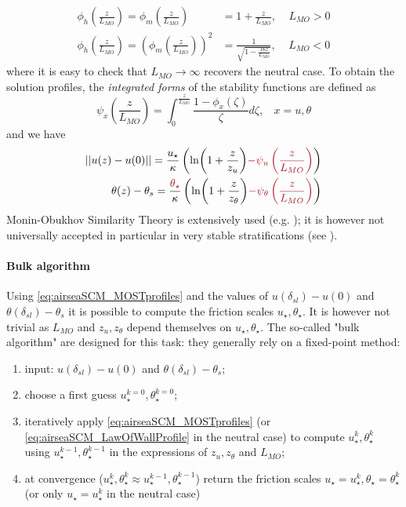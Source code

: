 \begin{equation}
\begin{aligned}
	\phi_h(\frac{z}{L_{MO}}) = \phi_m(\frac{z}{L_{MO}})
	&= 1+ \frac{z}{L_{MO}},
	~~~~~ L_{MO} > 0\\
	\phi_h(\frac{z}{L_{MO}}) =
	\left(\phi_m(\frac{z}{L_{MO}})\right)^2
	&= \frac{1}{\sqrt{1 - \frac{16 z}{L_{MO}}}},
	~~~~~L_{MO} < 0
\end{aligned}
\end{equation}
where it is easy to check that $L_{MO}\rightarrow \infty$
recovers the neutral case.
To obtain the solution profiles,
the \textit{integrated forms}
of the stability functions are defined as
\begin{equation}
	\psi_x \left(\frac{z}{L_{MO}}\right)
	= \int_0^{\frac{z}{L_{MO}}}
	\frac{1 - \phi_x(\zeta)}{\zeta} d\zeta
	, ~~~~x=u,\theta
\end{equation}
and we have
\begin{equation}
\label{eq:airseaSCM_MOSTprofiles}
\begin{aligned}
	||u(z)-u(0)|| = \frac{u_\star}{\kappa}
    \left(
	\ln(1+\frac{z}{z_{u}})
	\emphase{- \psi_u\left(\frac{z}{L_{MO}}\right)}
    \right)
    \\
    \theta(z) - \theta_s = 
	\frac{\emphase{\theta_\star}}{\kappa}
    \left(
	\ln(1+\frac{z}{z_{\theta}})
	\emphase{- \psi_\theta\left(\frac{z}{L_{MO}}\right)}
\right)
\end{aligned}
\end{equation}
Monin-Obukhov Similarity Theory
is extensively used (e.g. \citep{basu_cautionary_2017});
it is however not universally
accepted in particular in very stable stratifications
(see \citep{optis_moving_2014}).
\paragraph{Bulk algorithm}
Using \eqref{eq:airseaSCM_MOSTprofiles} and the values of
$u(\delta_{sl}) - u(0)$ and $\theta(\delta_{sl}) - \theta_s$
it is possible to compute the friction scales
$u_\star, \theta_\star$. It is however not trivial as
$L_{MO}$ and $z_u, z_\theta$ depend themselves on
$u_\star, \theta_\star$.
The so-called "bulk algorithm" are designed for this
task: they generally rely on a fixed-point method:
\begin{enumerate}
\item input: $u(\delta_{sl}) - u(0)$
		and $\theta(\delta_{sl}) - \theta_s$;
\item choose a first guess $u_\star^{k=0}, \theta_\star^{k=0}$;
\item iteratively apply
	\eqref{eq:airseaSCM_MOSTprofiles} (or
	\eqref{eq:airseaSCM_LawOfWallProfile} in the neutral case)
	to compute $u_\star^{k}, \theta_\star^{k}$ using
	$u_\star^{k-1}, \theta_\star^{k-1}$
	in the expressions of $z_u, z_\theta$ and $L_{MO}$;
\item at convergence ($u_\star^{k},\theta_\star^{k} \approx
	u_\star^{k-1},\theta_\star^{k-1}$) return the friction
		scales $u_\star = u_\star^{k},
		\theta_\star = \theta_\star^{k}$ (or only
		$u_\star = u_\star^{k}$ in the neutral case)
\end{enumerate}
